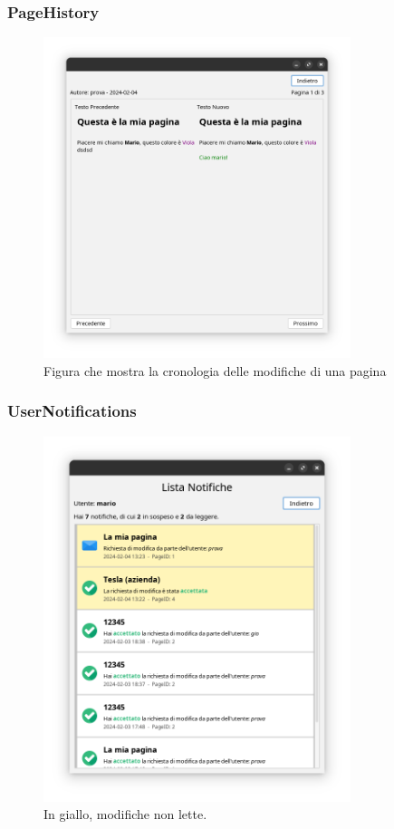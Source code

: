 \documentclass{article}
\begin{document}
	{\subsubsection{PageHistory}}
	\begin{figure}[htbp]
		\centering
		\includegraphics[width=0.8\textwidth,height=0.8\textheight,keepaspectratio]{page_history.png}
		\caption{Figura che mostra la cronologia delle modifiche di una pagina}
		\label{fig:7}
	\end{figure}
	
	\newpage
	
	{\subsubsection{UserNotifications}}
		\begin{figure}[htbp]
		\centering
		\includegraphics[width=0.8\textwidth,height=0.8\textheight,keepaspectratio]{user_notifications.png}
		\caption{In giallo, modifiche non lette.}
		\label{fig:8}
	\end{figure}
	
\end{document}
